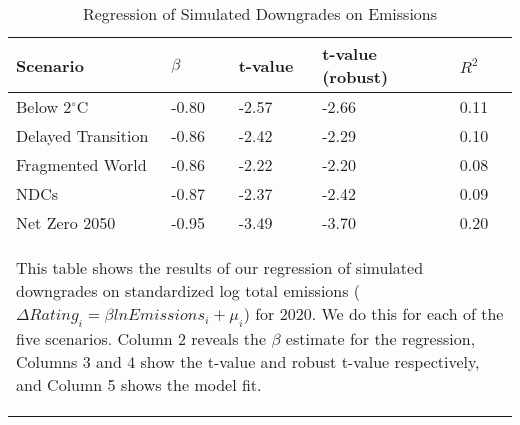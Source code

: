 
\begin{table}[tb!]
\footnotesize
\center
\caption{Regression of Simulated Downgrades on Emissions}
\label{tab:tab4}
\begin{tabularx}{\textwidth}{X X X X X}
\hline
Scenario & $\beta$ & t-value & t-value (robust) & $R^{2}$ \\
\hline
Below 2$^\circ$C  &  -0.80  &  -2.57  &  -2.66  &  0.11 \\
Delayed Transition  &  -0.86  &  -2.42  &  -2.29  &  0.10 \\
Fragmented World  &  -0.86  &  -2.22  &  -2.20  &  0.08 \\
NDCs &  -0.87  &  -2.37  &  -2.42  &  0.09 \\
Net Zero 2050 &  -0.95  &  -3.49  &  -3.70  &  0.20 \\
\hline
\multicolumn{5}{p{\textwidth}}{\begin{footnotesize}This table shows the results of our regression of simulated downgrades on standardized log total emissions ($\Delta Rating_{i} = \beta lnEmissions_{i} + \mu_{i}$) for 2020. We do this for each of the five scenarios. Column 2 reveals the $\beta$ estimate for the regression, Columns 3 and 4 show the t-value and robust t-value respectively, and Column 5 shows the model fit.
\end{footnotesize}
}
\end{tabularx}
\end{table}
